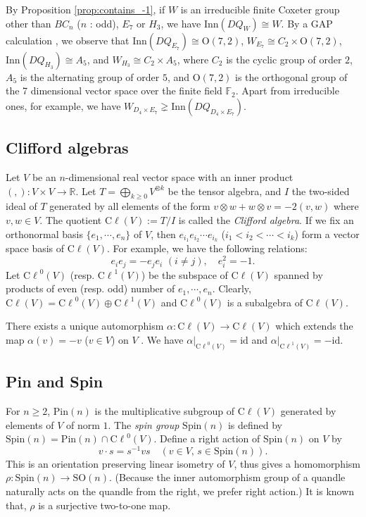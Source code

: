 \documentclass{amsart}
\theoremstyle{definition}
\theoremstyle{remark}
\numberwithin{equation}{section}
\newcommand{\Cl}{\mathrm{C\ell}}
\begin{document}
By Proposition \ref{prop:contains_-1}, 
if $W$ is an irreducible finite Coxeter group other than $BC_n$ ($n$ : odd), $E_7$ or $H_3$, 
we have $\mathrm{Inn} (DQ_{W}) \cong W$.
By a GAP calculation \cite{Gap}, 
we observe that $\mathrm{Inn} (DQ_{E_7}) \cong \mathrm{O}(7,2)$, 
$W_{E_7} \cong C_2 \times \mathrm{O}(7,2)$, 
$\mathrm{Inn} (DQ_{H_3}) \cong A_5$, 
and $W_{H_3} \cong C_2 \times A_5$, 
where $C_2$ is the cyclic group of order $2$, 
$A_5$ is the alternating group of order $5$, 
and $\mathrm{O}(7,2)$ is the orthogonal group of the 7 dimensional vector space 
over the finite field $\mathbb{F}_2$.
Apart from irreducible ones, for example, we have 
$W_{D_4 \times E_7}  \gneq \mathrm{Inn} (DQ_{D_4 \times E_7})$.


\subsection{Clifford algebras}
Let $V$ be an $n$-dimensional real vector space with an inner product 
$(,) : V \times V \to \mathbb{R}$.
Let $\displaystyle T = \bigoplus_{k \geq 0} V^{\otimes k}$ be the tensor algebra, 
and $I$ the two-sided ideal of $T$ generated by all elements of the form
$v \otimes w + w \otimes v =-2 (v, w)$ where $v, w \in V$.
The quotient $\Cl(V) := T/I$ is called the \emph{Clifford algebra}.
If we fix an orthonormal basis $\{ e_1, \cdots , e_n \}$ of $V$,
then $e_{i_1} e_{i_2} \cdots e_{i_k}$ ($i_1 < i_2 < \cdots < i_k$) form
a vector space basis of $\Cl(V)$.
For example, we have the following relations:
\[
e_i e_j = - e_j e_i \,\, (i \neq j), \quad e_i^2 = -1.
\]
Let $\Cl ^{0}(V)$ (resp. $\Cl ^{1}(V)$) be the subspace of $\Cl(V)$ 
spanned by products of even (resp. odd) number of $e_1, \cdots , e_n$. 
Clearly, $\Cl (V) = \Cl ^{0}(V) \oplus \Cl ^{1}(V)$ and 
$\Cl ^{0}(V)$ is a subalgebra of $\Cl(V)$.

There exists a unique automorphism $\alpha : \Cl (V) \to \Cl (V)$ which extends
the map $\alpha(v) = - v$ ($v \in V$) on $V$ \cite[p. 9]{LawsonMichelsohn}.
We have $\alpha|_{\Cl ^{0}(V)} = \mathrm{id}$ and $\alpha|_{\Cl ^{1}(V)} = -\mathrm{id}$.

\subsection{Pin and Spin}
For $n \geq 2$, $\mathrm{Pin}(n)$ is the multiplicative subgroup of $\Cl(V)$ 
generated by elements of $V$ of norm $1$.
The \emph{spin group} $\mathrm{Spin}(n)$ is defined by 
$\mathrm{Spin} (n) = \mathrm{Pin}(n) \cap \Cl^{0}(V)$.
Define a right action of $\mathrm{Spin}(n)$ on $V$ by
\begin{equation}
\label{eq:spin_action}
v \cdot s = s^{-1} v s
\quad (v \in V, \, s \in \mathrm{Spin}(n) ).
\end{equation}
This is an orientation preserving linear isometry of $V$, 
thus gives a homomorphism $\rho : \mathrm{Spin}(n) \to \mathrm{SO}(n)$.
(Because the inner automorphism group of a quandle naturally acts on the quandle
from the right, we prefer right action.)
It is known that, $\rho$ is a surjective two-to-one map.
\end{document}
